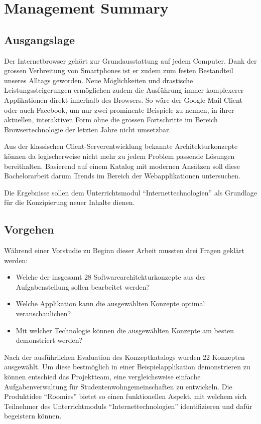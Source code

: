 \chapter{Management Summary}

\section{Ausgangslage}
Der Internetbrowser gehört zur Grundausstattung auf jedem Computer. Dank der grossen Verbreitung von Smartphones ist er zudem zum festen Bestandteil unseres Alltags geworden. Neue Möglichkeiten und drastische Leistungssteigerungen ermöglichen zudem die Ausführung immer komplexerer Applikationen direkt innerhalb des Browsers. So wäre der Google Mail Client oder auch Facebook, um nur zwei prominente Beispiele zu nennen, in ihrer aktuellen, interaktiven Form ohne die grossen Fortschritte im Bereich Browsertechnologie der letzten Jahre nicht umsetzbar.

Aus der klassischen Client-Serverentwicklung bekannte Architekturkonzepte können da logischerweise nicht mehr zu jedem Problem passende Lösungen bereithalten. Basierend auf einem Katalog mit modernen Ansätzen soll diese Bachelorarbeit darum Trends im Bereich der Webapplikationen untersuchen.

Die Ergebnisse sollen dem Unterrichtsmodul ``Internettechnologien'' als Grundlage für die Konzipierung neuer Inhalte dienen.


\section{Vorgehen}

Während einer Vorstudie zu Beginn dieser Arbeit mussten drei Fragen geklärt werden:

\begin{itemize}
	\item Welche der insgesamt 28 Softwarearchitekturkonzepte aus der Aufgabenstellung sollen bearbeitet werden?
	\item Welche Applikation kann die ausgewählten Konzepte optimal veranschaulichen?
	\item Mit welcher Technologie können die ausgewählten Konzepte am besten demonstriert werden?
\end{itemize}

Nach der ausführlichen Evaluation des Konzeptkatalogs wurden 22 Konzepten ausgewählt. Um diese bestmöglich in einer Beispielapplikation demonstrieren zu können entschied das Projektteam, eine vergleichsweise einfache Aufgabenverwaltung für Studentenwohngemeinschaften zu entwickeln. Die Produktidee ``Roomies'' bietet so einen funktionellen Aspekt, mit welchem sich Teilnehmer des Unterrichtmoduls ``Internettechnologien'' identifizieren und dafür begeistern können.

